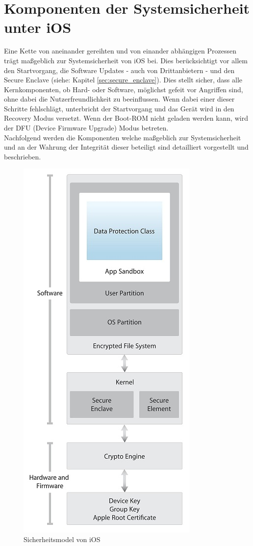 \section{Komponenten der Systemsicherheit unter
iOS}\label{sec:components-syssec} 
	Eine Kette von aneinander gereihten und von einander abhängigen Prozessen trägt
	maßgeblich zur Systemsicherheit von iOS bei. Dies berücksichtigt vor allem den
	Startvorgang, die Software Updates - auch von Drittanbietern - und den Secure
	Enclave (siehe: Kapitel \ref{sec:secure_enclave}). Dies stellt sicher, dass
	alle Kernkomponenten, ob Hard- oder Software, möglichst gefeit vor Angriffen sind,
	ohne dabei die Nutzerfreundlichkeit zu beeinflussen. Wenn dabei einer dieser
	Schritte fehlschlägt, unterbricht der Startvorgang und das Gerät wird in den
	Recovery Modus versetzt. Wenn der Boot-ROM nicht geladen werden kann, wird der
	DFU (Device Firmware Upgrade) Modus betreten.\\
	Nachfolgend werden die Komponenten welche maßgeblich zur Systemsicherheit und
	an der Wahrung der Integrität dieser beteiligt sind	detailliert vorgestellt und beschrieben.
	
	\begin{figure}[h]
		\centering
		\includegraphics[width=0.4\linewidth]{ios/media/security-model.jpg}
		\caption{Sicherheitsmodel von iOS 
		\cite[S.4]{iOSSecurityApr2015}}
		\label{fig:security-model}
	\end{figure}

